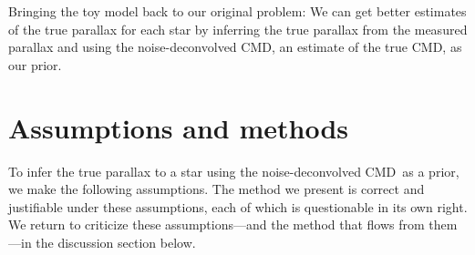 \documentclass[modern]{aastex61}
\newcommand{\acronym}[1]{{\small{#1}}}
\newcommand{\cmd}{\acronym{CMD}}
\begin{document}
Bringing the toy model back to our original problem:
We can get better estimates of the true parallax for each star by inferring the true parallax from the measured parallax and using the noise-deconvolved \cmd, an estimate of the true \cmd, as our prior.

\section{Assumptions and methods}\label{sec:method}

To infer the true parallax to a star using the noise-deconvolved \cmd\ as a prior, we make the following assumptions. The method we present is correct
and justifiable under these assumptions, each of which is questionable
in its own right. We return to criticize these assumptions---and the
method that flows from them---in the discussion section below.
\end{document}
